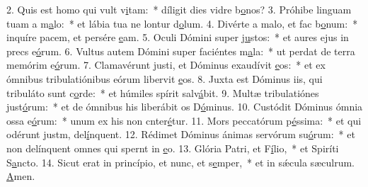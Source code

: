 2. Quis est homo qui vult v\uline{i}tam:~* díligit dies vidre b\uline{o}nos?
3. Próhibe linguam tuam a m\uline{a}lo:~* et lábia tua ne lontur d\uline{o}lum.
4. Divérte a malo, et fac b\uline{o}num:~* inquíre pacem, et persére \uline{e}am.
5. Oculi Dómini super j\uline{u}stos:~* et aures ejus in precs e\uline{ó}rum.
6. Vultus autem Dómini super faciéntes m\uline{a}la:~* ut perdat de terra memórim e\uline{ó}rum.
7. Clamavérunt justi, et Dóminus exaudívit \uline{e}os:~* et ex ómnibus tribulatiónibus eórum libervit \uline{e}os.
8. Juxta est Dóminus iis, qui tribuláto sunt c\uline{o}rde:~* et húmiles spírit salv\uline{á}bit.
9. Multæ tribulatiónes just\uline{ó}rum:~* et de ómnibus his liberábit os D\uline{ó}minus.
10. Custódit Dóminus ómnia ossa e\uline{ó}rum:~* unum ex his non cnter\uline{é}tur.
11. Mors peccatórum p\uline{é}ssima:~* et qui odérunt justm, del\uline{í}nquent.
12. Rédimet Dóminus ánimas servórum su\uline{ó}rum:~* et non delínquent omnes qui spernt in \uline{e}o.
13. Glória Patri, et F\uline{í}lio,~* et Spiríti S\uline{a}ncto.
14. Sicut erat in princípio, et nunc, et s\uline{e}mper,~* et in sǽcula sæculrum. \uline{A}men.
